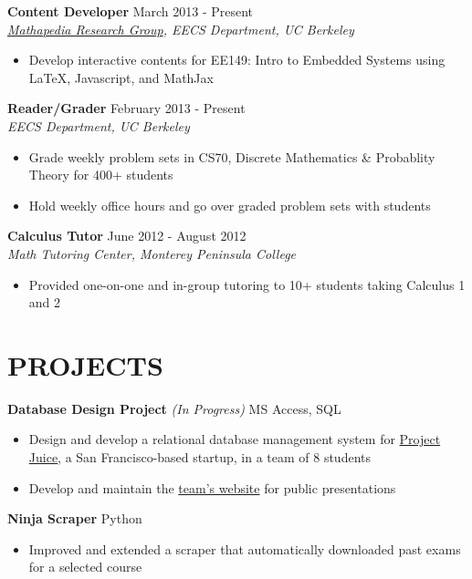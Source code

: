 \documentclass[margin]{res}
\begin{document}
\begin{resume}
\textbf{Content Developer} \hfill March 2013 - Present \\
\textit{\href{https://mathapedia.com/}{Mathapedia Research Group}, EECS Department, UC Berkeley} \smallskip
\begin{itemize}[leftmargin=10pt]
\item Develop interactive contents for EE149: Intro to Embedded Systems using \LaTeX{}, Javascript, and MathJax
\end{itemize}

\textbf{Reader/Grader} \hfill February 2013 - Present\\
\textit{EECS Department, UC Berkeley} \smallskip
\begin{itemize}[leftmargin=10pt]
\item Grade weekly problem sets in CS70, Discrete Mathematics \& Probablity Theory for 400+ students
\item Hold weekly office hours and go over graded problem sets with students
\end{itemize}

\textbf{Calculus Tutor} \hfill June 2012 - August 2012 \\
\textit{Math Tutoring Center, Monterey Peninsula College} \smallskip
\begin{itemize}[leftmargin=10pt]
\item Provided one-on-one and in-group tutoring to 10+ students taking Calculus 1 and 2
\end{itemize}

\section{PROJECTS} 
\textbf{Database Design Project} \textit{(In Progress)} \hfill MS Access, SQL
\begin{itemize}[leftmargin=10pt]
\itemsep -2pt %
\item Design and develop a relational database management system for \href{http://www.projectjuice.com/}{Project Juice}, a San Francisco-based startup, in a team of 8 students
\item Develop and maintain the \href{http://www.ocf.berkeley.edu/~kqdtran/ieor115/proposal}{team's website} for public presentations
\end{itemize}

\textbf{Ninja Scraper} \hfill Python
\begin{itemize}[leftmargin=10pt]
\itemsep -2pt %
\item Improved and extended a scraper that automatically downloaded past exams for a selected course
\end{itemize}


\end{resume}
\end{document}
